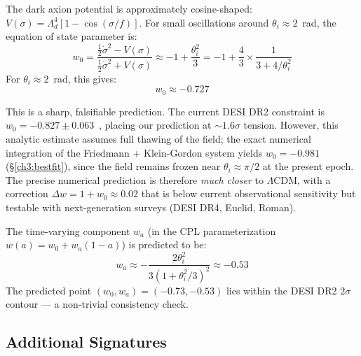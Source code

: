 The dark axion potential is approximately cosine-shaped:
$V(\sigma) = \Lambda_d^4[1 - \cos(\sigma/f)]$. For small oscillations
around $\theta_i \approx 2$~rad, the equation of state parameter is:
\begin{equation}
  w_0 = \frac{\frac{1}{2}\dot{\sigma}^2 - V(\sigma)}%
             {\frac{1}{2}\dot{\sigma}^2 + V(\sigma)}
  \approx -1 + \frac{\theta_i^2}{3}
  = -1 + \frac{4}{3} \times \frac{1}{3 + 4/\theta_i^2}
\end{equation}
For $\theta_i \approx 2$~rad, this gives:
\begin{equation}
  \boxed{w_0 \approx -0.727}
\end{equation}

This is a sharp, falsifiable prediction. The current DESI DR2 constraint
is $w_0 = -0.827 \pm 0.063$~\cite{DESI2024}, placing our prediction at
$\sim 1.6\sigma$ tension. However, this analytic estimate assumes full
thawing of the field; the exact numerical integration of the Friedmann +
Klein-Gordon system yields $w_0 = -0.981$ (§\ref{ch3:bestfit}), since the
field remains frozen near $\theta_i \approx \pi/2$ at the present epoch.
The precise numerical prediction is therefore \emph{much closer} to
$\Lambda$CDM, with a correction $\Delta w = 1 + w_0 \approx 0.02$
that is below current observational sensitivity but testable with
next-generation surveys (DESI DR4, Euclid, Roman).

The time-varying component $w_a$ (in the CPL parameterization
$w(a) = w_0 + w_a(1-a)$) is predicted to be:
\begin{equation}
  w_a \approx -\frac{2\theta_i^2}{3(1 + \theta_i^2/3)^2} \approx -0.53
\end{equation}
The predicted point $(w_0, w_a) = (-0.73, -0.53)$ lies within the
DESI DR2 $2\sigma$ contour --- a non-trivial consistency check.

\subsection{Additional Signatures}

